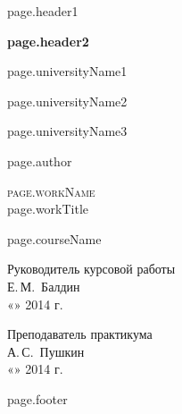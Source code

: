 \begin{center}
    \large
    {{ page.header1 }}

    \textbf{ {{ page.header2 }} }
    \vspace{0.5cm}

    {{ page.universityName1 }}
    \vspace{0.25cm}

    {{ page.universityName2 }}

    {{ page.universityName3 }}
    \vfill


    {{ page.author }}
    \vfill

    \textsc{ {{ page.workName }} }\\[5mm]

    {\LARGE {{ page.workTitle }} }
    \bigskip

    {{ page.courseName }}
\end{center}
\vfill

\newlength{\ML}
\hfill\begin{minipage}{0.4\textwidth}
          Руководитель курсовой работы\\
          \underline{\hspace{\ML}} Е.\,М.~Балдин\\
          «\underline{\hspace{0.7cm}}» \underline{\hspace{2cm}} 2014 г.
\end{minipage}%
\bigskip

\hfill\begin{minipage}{0.4\textwidth}
          Преподаватель практикума\\
          \underline{\hspace{\ML}} А.\,С.~Пушкин\\
          «\underline{\hspace{0.7cm}}» \underline{\hspace{2cm}} 2014 г.
\end{minipage}%
\vfill

\begin{center}
    {{ page.footer }}
\end{center}
\newpage
